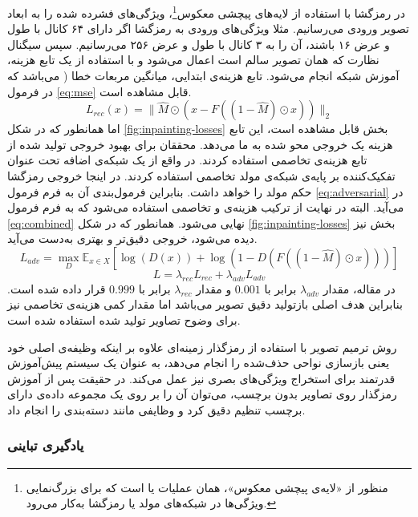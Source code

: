 در رمزگشا با استفاده از لایه‌های
پیچشی معکوس\footnote{منظور از «لایه‌ی پیچشی معکوس»، همان عملیات
 یا 
است که برای بزرگ‌نمایی ویژگی‌ها در شبکه‌های مولد یا رمزگشا به‌کار می‌رود.}،
ویژگی‌های فشرده شده را به ابعاد تصویر ورودی می‌رسانیم. مثلا ویژگی‌های ورودی به رمزگشا اگر دارای ۶۴ کانال با طول و عرض ۱۶ باشند، آن را به ۳ کانال با طول و عرض ۲۵۶ می‌رسانیم. سپس سیگنال نظارت که همان تصویر سالم است اعمال می‌شود و با استفاده از یک تابع هزینه، آموزش شبکه انجام می‌شود. تابع هزینه‌ی ابتدایی،
میانگین مربعات خطا (
می‌باشد
که در فرمول \ref{eq:mse} قابل مشاهده است.
\begin{equation}
    \label{eq:mse}
    L_{rec}(x) = \| \hat{M} \odot (x - F((1 -   \hat{M}) \odot x)) \|_2
\end{equation}
اما همانطور که در شکل \ref{fig:inpainting-losses} بخش 
قابل مشاهده است، این تابع هزینه یک خروجی محو شده به ما می‌دهد. محققان برای بهبود خروجی تولید شده از تابع هزینه‌ی تخاصمی استفاده کردند. در واقع از یک شبکه‌ی اضافه تحت عنوان
تفکیک‌کننده
بر پایه‌ی شبکه‌ی مولد تخاصمی استفاده کردند. در اینجا خروجی رمزگشا حکم مولد را خواهد داشت. بنابراین فرمول‌بندی آن به فرم فرمول \ref{eq:adversarial} در می‌آید.
البته در نهایت از ترکیب هزینه‌ی 
و تخاصمی استفاده می‌شود که به فرم فرمول
\ref{eq:combined}
نهایی می‌شود. همانطور که در شکل
\ref{fig:inpainting-losses}
بخش 
نیز دیده می‌شود، خروجی دقیق‌تر و بهتری به‌دست می‌آید.
\begin{equation}
    \label{eq:adversarial}
    L_{adv} = \max_{D} \mathbb{E}_{x \in X} [\log(D(x)) + \log(1 - D(F((1 - \hat{M}) \odot x)))]
\end{equation}
\begin{equation}
    \label{eq:combined}
    L = \lambda_{rec} L_{rec} + \lambda_{adv} L_{adv}
\end{equation}
در مقاله، مقدار
$\lambda_{adv}$ برابر با
$0.001$ و مقدار $\lambda_{rec}$ برابر با
$0.999$ قرار داده شده است.
بنابراین هدف اصلی بازتولید دقیق تصویر می‌باشد اما مقدار کمی هزینه‌ی تخاصمی نیز برای وضوح تصاویر تولید شده استفاده شده است.

روش ترمیم تصویر با استفاده از رمزگذار زمینه‌ای علاوه بر اینکه وظیفه‌ی اصلی خود یعنی بازسازی نواحی حذف‌شده را انجام می‌دهد، به عنوان یک سیستم پیش‌آموزش قدرتمند برای استخراج ویژگی‌های بصری نیز عمل می‌کند. در حقیقت پس از آموزش رمزگذار روی تصاویر بدون برچسب، می‌توان آن را بر روی یک مجموعه داده‌ی دارای برچسب تنظیم دقیق کرد و وظایفی مانند دسته‌بندی را انجام داد.

\subsubsection{یادگیری تباینی}

